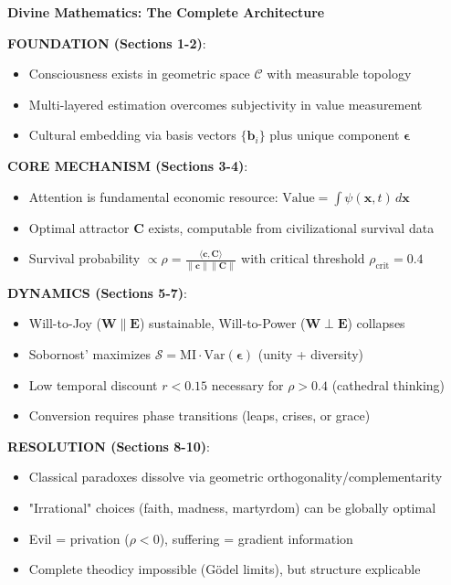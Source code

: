 \documentclass[11pt,a4paper]{article}
\theoremstyle{definition}
\theoremstyle{remark}
\newcommand{\CC}{\mathcal{C}}
\newcommand{\EE}{\mathbf{E}}
\newcommand{\WW}{\mathbf{W}}
\newcommand{\bb}{\mathbf{b}}
\newcommand{\cc}{\mathbf{c}}
\begin{document}
\begin{enumerate}
\begin{protocol}
\begin{mdframed}[backgroundcolor=blue!5,linewidth=2pt]
\textbf{Divine Mathematics: The Complete Architecture}

\textbf{FOUNDATION (Sections 1-2)}:
\begin{itemize}[nosep]
    \item Consciousness exists in geometric space \(\CC\) with measurable topology
    \item Multi-layered estimation overcomes subjectivity in value measurement
    \item Cultural embedding via basis vectors \(\{\bb_i\}\) plus unique component \(\boldsymbol{\epsilon}\)
\end{itemize}

\textbf{CORE MECHANISM (Sections 3-4)}:
\begin{itemize}[nosep]
    \item Attention is fundamental economic resource: \(\text{Value} = \int \psi(\mathbf{x},t) \, d\mathbf{x}\)
    \item Optimal attractor \(\mathbf{C}\) exists, computable from civilizational survival data
    \item Survival probability \(\propto \rho = \frac{\langle \cc, \mathbf{C} \rangle}{\|\cc\| \|\mathbf{C}\|}\) with critical threshold \(\rho_{\text{crit}} = 0.4\)
\end{itemize}

\textbf{DYNAMICS (Sections 5-7)}:
\begin{itemize}[nosep]
    \item Will-to-Joy (\(\WW \parallel \EE\)) sustainable, Will-to-Power (\(\WW \perp \EE\)) collapses
    \item Sobornost' maximizes \(\mathcal{S} = \text{MI} \cdot \text{Var}(\boldsymbol{\epsilon})\) (unity + diversity)
    \item Low temporal discount \(r < 0.15\) necessary for \(\rho > 0.4\) (cathedral thinking)
    \item Conversion requires phase transitions (leaps, crises, or grace)
\end{itemize}

\textbf{RESOLUTION (Sections 8-10)}:
\begin{itemize}[nosep]
    \item Classical paradoxes dissolve via geometric orthogonality/complementarity
    \item "Irrational" choices (faith, madness, martyrdom) can be globally optimal
    \item Evil = privation (\(\rho < 0\)), suffering = gradient information
    \item Complete theodicy impossible (Gödel limits), but structure explicable
\end{itemize}


\end{mdframed}
\end{protocol}
\end{enumerate}
\end{document}
